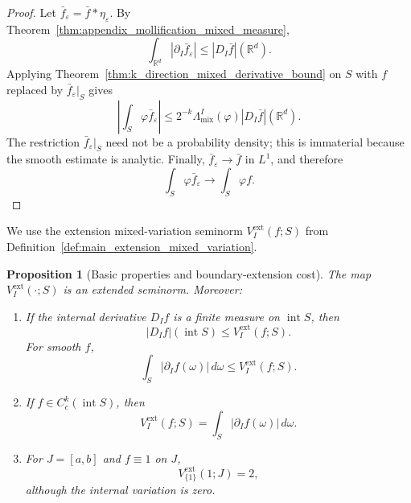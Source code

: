 \documentclass[11pt,letterpaper]{article}
\newtheorem{proposition}[theorem]{Proposition}
\theoremstyle{definition}
\theoremstyle{remark}
\begin{document}
\begin{proof}
Let $\bar f_\varepsilon=\bar f*\eta_\varepsilon$. By
Theorem~\ref{thm:appendix_mollification_mixed_measure},
$$
\int_{\mathbb R^d}|\partial_I\bar f_\varepsilon|
\le
|D_I\bar f|(\mathbb R^d).
$$
Applying Theorem~\ref{thm:k_direction_mixed_derivative_bound} on $S$
with $f$ replaced by $\bar f_\varepsilon|_S$ gives
$$
\left|\int_S\varphi\bar f_\varepsilon\right|
\le
2^{-k}\Lambda_{\mathrm{mix}}^I(\varphi)
|D_I\bar f|(\mathbb R^d).
$$
The restriction $\bar f_\varepsilon|_S$ need not be a probability density;
this is immaterial because the smooth estimate is analytic. Finally,
$\bar f_\varepsilon\to\bar f$ in $L^1$, and therefore
$$
\int_S\varphi\bar f_\varepsilon
\longrightarrow
\int_S\varphi f.
$$
\end{proof}

We use the extension mixed-variation seminorm $V_I^{\mathrm{ext}}(f;S)$ from Definition~\ref{def:main_extension_mixed_variation}.

\begin{proposition}[Basic properties and boundary-extension cost]
\label{prop:appendix_extension_mixed_variation_properties}
The map $V_I^{\mathrm{ext}}(\cdot;S)$ is an extended seminorm. Moreover:

\begin{enumerate}
\item[\emph{(i)}] If the internal derivative $D_If$ is a finite measure on
$\operatorname{int}S$, then
\begin{equation}
\label{eq:appendix_internal_mass_lower_bound}
|D_If|(\operatorname{int}S)
\le
V_I^{\mathrm{ext}}(f;S).
\end{equation}
For smooth $f$,
$$
\int_S|\partial_If(\omega)|\,d\omega
\le
V_I^{\mathrm{ext}}(f;S).
$$

\item[\emph{(ii)}] If $f\in C_c^k(\operatorname{int}S)$, then
\begin{equation}
\label{eq:appendix_compact_support_extension_equality}
V_I^{\mathrm{ext}}(f;S)
=
\int_S|\partial_If(\omega)|\,d\omega.
\end{equation}

\item[\emph{(iii)}] For $J=[a,b]$ and $f\equiv1$ on $J$,
\begin{equation}
\label{eq:appendix_constant_extension_variation}
V_{\{1\}}^{\mathrm{ext}}(1;J)=2,
\end{equation}
although the internal variation is zero.
\end{enumerate}
\end{proposition}
\end{document}
